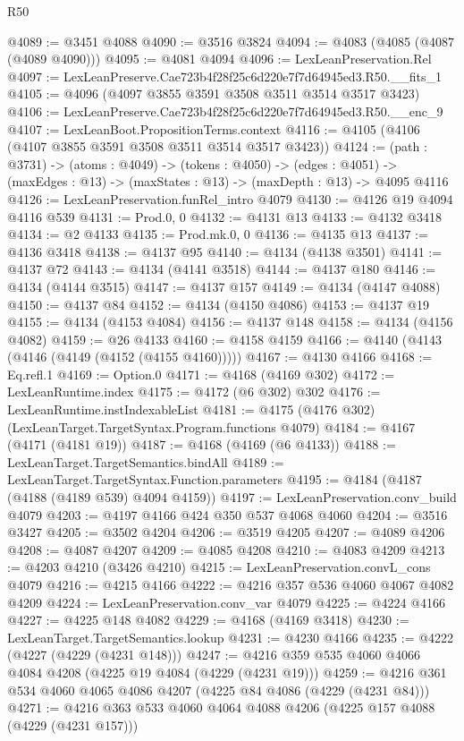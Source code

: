 \begin{lexlean}{R50}
\begin{coremodule}
@4089 := @3451 @4088
@4090 := @3516 @3824
@4094 := @4083 (@4085 (@4087 (@4089 @4090)))
@4095 := @4081 @4094
@4096 := LexLeanPreservation.Rel
@4097 := LexLeanPreserve.Cae723b4f28f25c6d220e7f7d64945ed3.R50.__fits_1
@4105 := @4096 (@4097 @3855 @3591 @3508 @3511 @3514 @3517 @3423)
@4106 := LexLeanPreserve.Cae723b4f28f25c6d220e7f7d64945ed3.R50.__enc_9
@4107 := LexLeanBoot.PropositionTerms.context
@4116 := @4105 (@4106 (@4107 @3855 @3591 @3508 @3511 @3514 @3517 @3423))
@4124 := (path : @3731) ->
  (atoms : @4049) ->
  (tokens : @4050) ->
  (edges : @4051) -> (maxEdges : @13) -> (maxStates : @13) -> (maxDepth : @13) -> @4095 @4116
@4126 := LexLeanPreservation.funRel_intro @4079
@4130 := @4126 @19 @4094 @4116 @539
@4131 := Prod.{0, 0}
@4132 := @4131 @13
@4133 := @4132 @3418
@4134 := @2 @4133
@4135 := Prod.mk.{0, 0}
@4136 := @4135 @13
@4137 := @4136 @3418
@4138 := @4137 @95
@4140 := @4134 (@4138 @3501)
@4141 := @4137 @72
@4143 := @4134 (@4141 @3518)
@4144 := @4137 @180
@4146 := @4134 (@4144 @3515)
@4147 := @4137 @157
@4149 := @4134 (@4147 @4088)
@4150 := @4137 @84
@4152 := @4134 (@4150 @4086)
@4153 := @4137 @19
@4155 := @4134 (@4153 @4084)
@4156 := @4137 @148
@4158 := @4134 (@4156 @4082)
@4159 := @26 @4133
@4160 := @4158 @4159
@4166 := @4140 (@4143 (@4146 (@4149 (@4152 (@4155 @4160)))))
@4167 := @4130 @4166
@4168 := Eq.refl.{1}
@4169 := Option.{0}
@4171 := @4168 (@4169 @302)
@4172 := LexLeanRuntime.index
@4175 := @4172 (@6 @302) @302
@4176 := LexLeanRuntime.instIndexableList
@4181 := @4175 (@4176 @302) (LexLeanTarget.TargetSyntax.Program.functions @4079)
@4184 := @4167 (@4171 (@4181 @19))
@4187 := @4168 (@4169 (@6 @4133))
@4188 := LexLeanTarget.TargetSemantics.bindAll
@4189 := LexLeanTarget.TargetSyntax.Function.parameters
@4195 := @4184 (@4187 (@4188 (@4189 @539) @4094 @4159))
@4197 := LexLeanPreservation.conv_build @4079
@4203 := @4197 @4166 @424 @350 @537 @4068 @4060
@4204 := @3516 @3427
@4205 := @3502 @4204
@4206 := @3519 @4205
@4207 := @4089 @4206
@4208 := @4087 @4207
@4209 := @4085 @4208
@4210 := @4083 @4209
@4213 := @4203 @4210 (@3426 @4210)
@4215 := LexLeanPreservation.convL_cons @4079
@4216 := @4215 @4166
@4222 := @4216 @357 @536 @4060 @4067 @4082 @4209
@4224 := LexLeanPreservation.conv_var @4079
@4225 := @4224 @4166
@4227 := @4225 @148 @4082
@4229 := @4168 (@4169 @3418)
@4230 := LexLeanTarget.TargetSemantics.lookup
@4231 := @4230 @4166
@4235 := @4222 (@4227 (@4229 (@4231 @148)))
@4247 := @4216 @359 @535 @4060 @4066 @4084 @4208 (@4225 @19 @4084 (@4229 (@4231 @19)))
@4259 := @4216 @361 @534 @4060 @4065 @4086 @4207 (@4225 @84 @4086 (@4229 (@4231 @84)))
@4271 := @4216 @363 @533 @4060 @4064 @4088 @4206 (@4225 @157 @4088 (@4229 (@4231 @157)))

\end{coremodule}
\end{lexlean}
